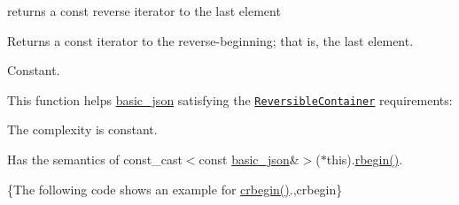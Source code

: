 returns a const reverse iterator to the last element 

Returns a const iterator to the reverse-\/beginning; that is, the last element.

  Constant.

This function helps {\ttfamily \hyperlink{classnlohmann_1_1basic__json}{basic\-\_\-json}} satisfying the \href{http://en.cppreference.com/w/cpp/concept/ReversibleContainer}{\tt Reversible\-Container} requirements\-:
\begin{DoxyItemize}
\item The complexity is constant.
\item Has the semantics of {\ttfamily const\-\_\-cast$<$const \hyperlink{classnlohmann_1_1basic__json}{basic\-\_\-json}\&$>$($\ast$this).\hyperlink{classnlohmann_1_1basic__json_a62ccf5b9b3674aec2403fbc02da03db8}{rbegin()}}.
\end{DoxyItemize}

\{The following code shows an example for {\ttfamily \hyperlink{classnlohmann_1_1basic__json_a060b33f8f255986088652625f9d50681}{crbegin()}}.,crbegin\}

